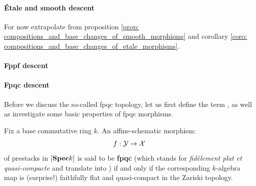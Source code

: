                 \paragraph{\'Etale and smooth descent} \label{paragraph: etale_descent}  
                    \begin{remark} \label{remark: smooth_and_etale_sieves}
                        For now extrapolate from proposition \ref{prop: compositions_and_base_changes_of_smooth_morphisms} and corollary \ref{coro: compositions_and_base_changes_of_etale_morphisms}.
                    \end{remark}
                
                \paragraph{Fppf descent} 
                
                \paragraph{Fpqc descent} 
                    Before we discuss the so-called fpqc topology, let us first define the term , as well as investigate some basic properties of fpqc morphisms.
                    
                    \begin{definition} \label{def: fpqc_morphisms} 
                        Fix a base commutative ring $k$. An affine-schematic morphism:
                            $$f: \mathcal{Y} \to \mathcal{X}$$
                        of prestacks in $[\mathbf{Spec} k]$ is said to be \textbf{fpqc} (which stands for \textit{fid\`element plat et quasi-compacte} and translate into ) if and only if the corresponding $k$-algebra map is (surprise!) faithfully flat and quasi-compact in the Zariski topology.
                    \end{definition}
                    
